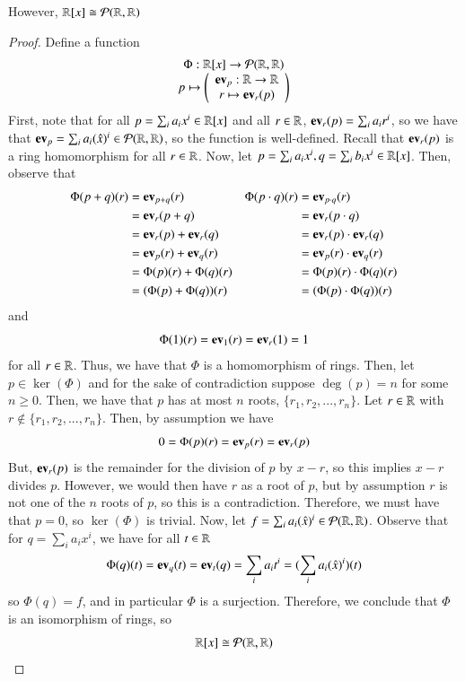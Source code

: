 \documentclass[12pt, a4paper, oneside, openright, titlepage]{book}
\begin{document}
\begin{claim}
    However, $\mathbb R[x] \cong \mathcal{P}(\mathbb R,\mathbb R)$
\end{claim}
\begin{proof}
    Define a function $$\begin{array}{c} \Phi:\mathbb R[x] \rightarrow \mathcal{P}(\mathbb R,\mathbb R) \\ p\mapsto \left(\begin{array}{c} \operatorname{\bf{ev}}_p:\mathbb R\rightarrow \mathbb R \\ r \mapsto \operatorname{\bf{ev}}_r(p) \end{array}\right) \end{array}$$
    First, note that for all $p = \sum_ia_ix^i \in \mathbb R[x]$ and all $r \in \mathbb R$, $\operatorname{\bf{ev}}_r(p) = \sum_ia_ir^i$, so we have that $\operatorname{\bf{ev}}_p = \sum_ia_i(\hat{x})^i \in \mathcal{P}(\mathbb R,\mathbb R)$, so the function is well-defined. Recall that $\operatorname{\bf{ev}}_r(p)$ is a ring homomorphism for all $r \in \mathbb R$. Now, let $p = \sum_ia_ix^i, q = \sum_ib_ix^i \in \mathbb R[x]$. Then, observe that \begin{align*}
        \Phi(p+q)(r) &= \operatorname{\bf{ev}}_{p+q}(r)  & \Phi(p\cdot q)(r) &= \operatorname{\bf{ev}}_{p\cdot q}(r)\\
        &= \operatorname{\bf{ev}}_r(p+q) & &= \operatorname{\bf{ev}}_r(p\cdot q) \\
        &= \operatorname{\bf{ev}}_r(p) + \operatorname{\bf{ev}}_r(q) & &= \operatorname{\bf{ev}}_r(p) \cdot\operatorname{\bf{ev}}_r(q) \\
        &= \operatorname{\bf{ev}}_p(r) + \operatorname{\bf{ev}}_q(r) &  &= \operatorname{\bf{ev}}_p(r) \cdot \operatorname{\bf{ev}}_q(r) \\
        &= \Phi(p)(r) + \Phi(q)(r) & &= \Phi(p)(r) \cdot \Phi(q)(r)\\
        &= (\Phi(p) + \Phi(q))(r) & &= (\Phi(p) \cdot \Phi(q))(r)
    \end{align*}
    and $$\Phi(1)(r) = \operatorname{\bf{ev}}_{1}(r) = \operatorname{\bf{ev}}_r(1) = 1$$
    for all $r \in \mathbb R$. Thus, we have that $\Phi$ is a homomorphism of rings. Then, let $p \in \ker(\Phi)$ and for the sake of contradiction suppose $\deg(p) = n$ for some $n \geq 0$. Then, we have that $p$ has at most $n$ roots, $\{r_1,r_2,...,r_n\}$. Let $r \in \mathbb R$ with $r \notin\{r_1,r_2,...,r_n\}$. Then, by assumption we have $$0 = \Phi(p)(r) = \operatorname{\bf{ev}}_p(r) = \operatorname{\bf{ev}}_r(p)$$
    But, $\operatorname{\bf{ev}}_r(p)$ is the remainder for the division of $p$ by $x - r$, so this implies $x-r$ divides $p$. However, we would then have $r$ as a root of $p$, but by assumption $r$ is not one of the $n$ roots of $p$, so this is a contradiction. Therefore, we must have that $p = 0$, so $\ker(\Phi)$ is trivial. Now, let $f = \sum_ia_i(\hat{x})^i \in \mathcal{P}(\mathbb R,\mathbb R)$. Observe that for $q = \sum_ia_ix^i$, we have for all $t \in \mathbb R$ $$\Phi(q)(t) = \operatorname{\bf{ev}}_q(t) = \operatorname{\bf{ev}}_t(q) = \sum_ia_it^i = (\sum_ia_i(\hat{x})^i)(t)$$
    so $\Phi(q) = f$, and in particular $\Phi$ is a surjection. Therefore, we conclude that $\Phi$ is an isomorphism of rings, so \begin{equation}
        \mathbb R[x] \cong \mathcal{P}(\mathbb R,\mathbb R)
    \end{equation}
\end{proof}
\end{document}
